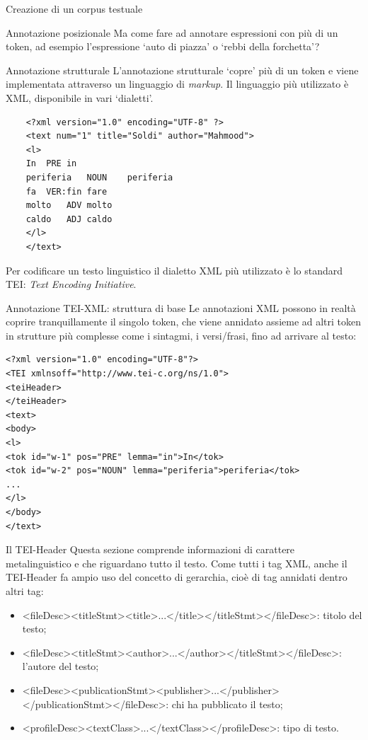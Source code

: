 \documentclass[pdf]{prosper}
\begin{document}
\begin{tsectionandpart}{Creazione di un corpus testuale}
\begin{slide}{Annotazione posizionale}
	Ma come fare ad annotare espressioni con più di un token, ad esempio l'espressione `auto di piazza' o `rebbi della forchetta'?
\end{slide}

\begin{slide}{Annotazione strutturale}
L'annotazione strutturale `copre' più di un token e viene implementata attraverso un linguaggio di {\it markup}. Il linguaggio più utilizzato è XML, disponibile in vari `dialetti'.


	\begin{verbatim}
	<?xml version="1.0" encoding="UTF-8" ?>
	<text num="1" title="Soldi" author="Mahmood">
	<l>
	In	PRE	in
	periferia	NOUN	periferia
	fa	VER:fin	fare
	molto	ADV	molto
	caldo	ADJ	caldo
	</l>
	</text>
	\end{verbatim}

Per codificare un testo linguistico il dialetto XML più utilizzato è lo standard TEI: {\it Text Encoding Initiative}.

\end{slide}

\begin{slide}{Annotazione TEI-XML: struttura di base}
Le annotazioni XML possono in realtà coprire tranquillamente il singolo token, che viene annidato assieme ad altri token in strutture più complesse come i sintagmi, i versi/frasi, fino ad arrivare al testo:

\begin{verbatim}
<?xml version="1.0" encoding="UTF-8"?>
<TEI xmlnsoff="http://www.tei-c.org/ns/1.0">
<teiHeader>
</teiHeader>
<text>
<body>
<l>
<tok id="w-1" pos="PRE" lemma="in">In</tok>
<tok id="w-2" pos="NOUN" lemma="periferia">periferia</tok>
...
</l>
</body>
</text>
\end{verbatim}
\end{slide}

\begin{slide}{Il TEI-Header}
Questa sezione comprende informazioni di carattere metalinguistico e che riguardano tutto il testo. Come tutti i tag XML, anche il TEI-Header fa ampio uso del concetto di gerarchia, cioè di tag annidati dentro altri tag:

	\begin{itemize}
	\item <fileDesc><titleStmt><title>...</title></titleStmt></fileDesc>: titolo del testo;
	\item <fileDesc><titleStmt><author>...</author></titleStmt></fileDesc>: l'autore del testo;
	\item  <fileDesc><publicationStmt><publisher>...</publisher></publicationStmt></fileDesc>: chi ha pubblicato il testo;
	\item <profileDesc><textClass>...</textClass></profileDesc>: tipo di testo.
	\end{itemize}



\end{slide}
\end{tsectionandpart}
	


\end{document}
